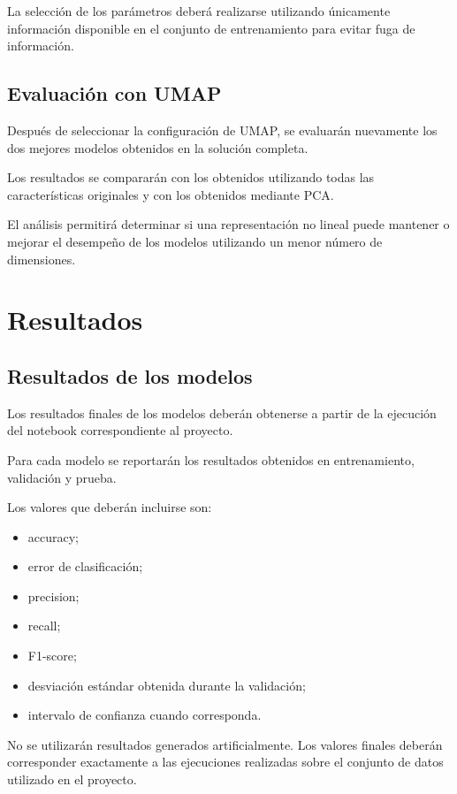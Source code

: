 \documentclass[conference]{IEEEtran}
\begin{document}
La selección de los parámetros deberá realizarse utilizando únicamente información disponible en el conjunto de entrenamiento para evitar fuga de información.


\subsection{Evaluación con UMAP}

Después de seleccionar la configuración de UMAP, se evaluarán nuevamente los dos mejores modelos obtenidos en la solución completa.

Los resultados se compararán con los obtenidos utilizando todas las características originales y con los obtenidos mediante PCA.

El análisis permitirá determinar si una representación no lineal puede mantener o mejorar el desempeño de los modelos utilizando un menor número de dimensiones.


\section{Resultados}

\subsection{Resultados de los modelos}

Los resultados finales de los modelos deberán obtenerse a partir de la ejecución del notebook correspondiente al proyecto.

Para cada modelo se reportarán los resultados obtenidos en entrenamiento, validación y prueba.

Los valores que deberán incluirse son:

\begin{itemize}
    \item accuracy;
    \item error de clasificación;
    \item precision;
    \item recall;
    \item F1-score;
    \item desviación estándar obtenida durante la validación;
    \item intervalo de confianza cuando corresponda.
\end{itemize}

No se utilizarán resultados generados artificialmente. Los valores finales deberán corresponder exactamente a las ejecuciones realizadas sobre el conjunto de datos utilizado en el proyecto.
\end{document}
